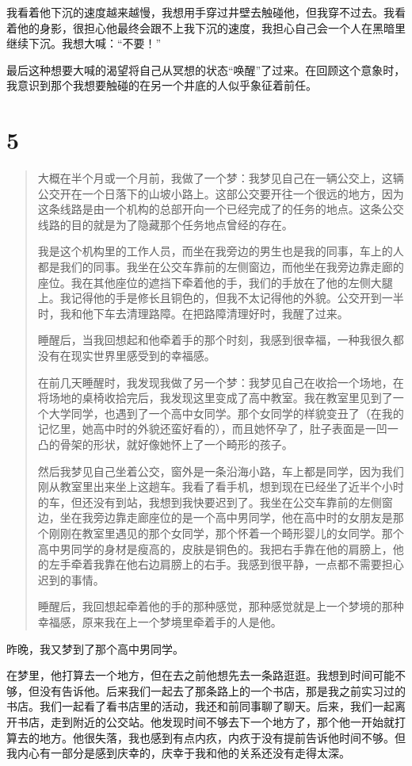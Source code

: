 我看着他下沉的速度越来越慢，我想用手穿过井壁去触碰他，但我穿不过去。我看着他的身影，很担心他最终会跟不上我下沉的速度，我担心自己会一个人在黑暗里继续下沉。我想大喊：“不要！”

最后这种想要大喊的渴望将自己从冥想的状态“唤醒”了过来。在回顾这个意象时，我意识到那个我想要触碰的在另一个井底的人似乎象征着前任。


\section*{5}

\blockquote{
大概在半个月或一个月前，我做了一个梦：我梦见自己在一辆公交上，这辆公交开在一个日落下的山坡小路上。这部公交要开往一个很远的地方，因为这条线路是由一个机构的总部开向一个已经完成了的任务的地点。这条公交线路的目的就是为了隐藏那个任务地点曾经的存在。

我是这个机构里的工作人员，而坐在我旁边的男生也是我的同事，车上的人都是我们的同事。我坐在公交车靠前的左侧窗边，而他坐在我旁边靠走廊的座位。我在其他座位的遮挡下牵着他的手，我们的手放在了他的左侧大腿上。我记得他的手是修长且铜色的，但我不太记得他的外貌。公交开到一半时，我和他下车去清理路障。在把路障清理好时，我醒了过来。

睡醒后，当我回想起和他牵着手的那个时刻，我感到很幸福，一种我很久都没有在现实世界里感受到的幸福感。

在前几天睡醒时，我发现我做了另一个梦：我梦见自己在收拾一个场地，在将场地的桌椅收拾完后，我发现这里变成了高中教室。我在教室里见到了一个大学同学，也遇到了一个高中女同学。那个女同学的样貌变丑了（在我的记忆里，她高中时的外貌还蛮好看的），而且她怀孕了，肚子表面是一凹一凸的骨架的形状，就好像她怀上了一个畸形的孩子。

然后我梦见自己坐着公交，窗外是一条沿海小路，车上都是同学，因为我们刚从教室里出来坐上这趟车。我看了看手机，想到现在已经坐了近半个小时的车，但还没有到站，我想到我快要迟到了。我坐在公交车靠前的左侧窗边，坐在我旁边靠走廊座位的是一个高中男同学，他在高中时的女朋友是那个刚刚在教室里遇见的那个女同学，那个怀着一个畸形婴儿的女同学。那个高中男同学的身材是瘦高的，皮肤是铜色的。我把右手靠在他的肩膀上，他的左手牵着我靠在他右边肩膀上的右手。我感到很平静，一点都不需要担心迟到的事情。

睡醒后，我回想起牵着他的手的那种感觉，那种感觉就是上一个梦境的那种幸福感，原来我在上一个梦境里牵着手的人是他。

}

昨晚，我又梦到了那个高中男同学。

在梦里，他打算去一个地方，但在去之前他想先去一条路逛逛。我想到时间可能不够，但没有告诉他。后来我们一起去了那条路上的一个书店，那是我之前实习过的书店。我们一起看了看书店里的活动，我还和前同事聊了聊天。后来，我们一起离开书店，走到附近的公交站。他发现时间不够去下一个地方了，那个他一开始就打算去的地方。他很失落，我也感到有点内疚，内疚于没有提前告诉他时间不够。但我内心有一部分是感到庆幸的，庆幸于我和他的关系还没有走得太深。

